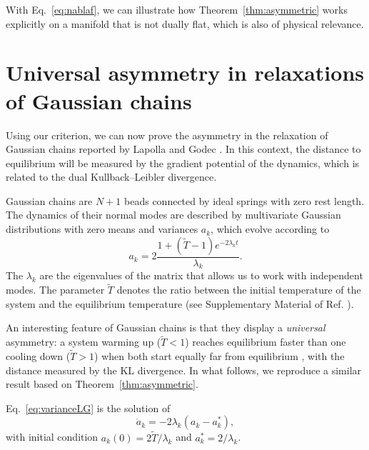 \documentclass{amsart}
\theoremstyle{definition}
\begin{document}


With Eq.~\eqref{eq:nablaf}, we can illustrate how Theorem~\ref{thm:asymmetric} 
works explicitly on a manifold that is not dually flat, which is also of physical relevance.

\section{Universal asymmetry in relaxations of Gaussian chains}\label{sec:GaussianChains}

Using our criterion, we can now prove the asymmetry in the relaxation of Gaussian chains reported by Lapolla and Godec \cite{lapolla_faster_2020}. In this context, the distance to equilibrium will be measured by the gradient potential of the dynamics, which is related to the dual Kullback–Leibler divergence.

Gaussian chains are $N+1$ beads connected by ideal springs with zero rest length. 
The dynamics of their normal modes are described by multivariate Gaussian distributions with zero means and variances $a_k$, 
which evolve according to
\begin{equation}
    a_k=2\frac{1+(\tilde T-1)e^{-2\lambda_kt}}{\lambda_k}.\label{eq:varianceLG}
\end{equation}
The $\lambda_k$ are the eigenvalues of the matrix that allows us to work with independent modes. The parameter $\tilde T$ denotes the ratio between the initial temperature of the system and the equilibrium temperature (see Supplementary Material of Ref. \cite{lapolla_faster_2020}).

An interesting feature of Gaussian chains is that they display a \textit{universal} asymmetry:
 a system warming up ($\tilde T<1$) reaches equilibrium faster than one cooling down ($\tilde T>1$) when both start equally far from equilibrium \cite{lapolla_faster_2020}, with the distance measured by the KL divergence. In what follows, we reproduce a similar result based on Theorem~\ref{thm:asymmetric}.

Eq.~\eqref{eq:varianceLG} is the solution of
\begin{equation}\label{eq:LG}
    \dot a_k=-2\lambda_k(a_k-a_k^*),
\end{equation}
with initial condition $a_k(0)=2\tilde T/\lambda_k$ and $a_k^*=2/\lambda_k$.
\end{document}
